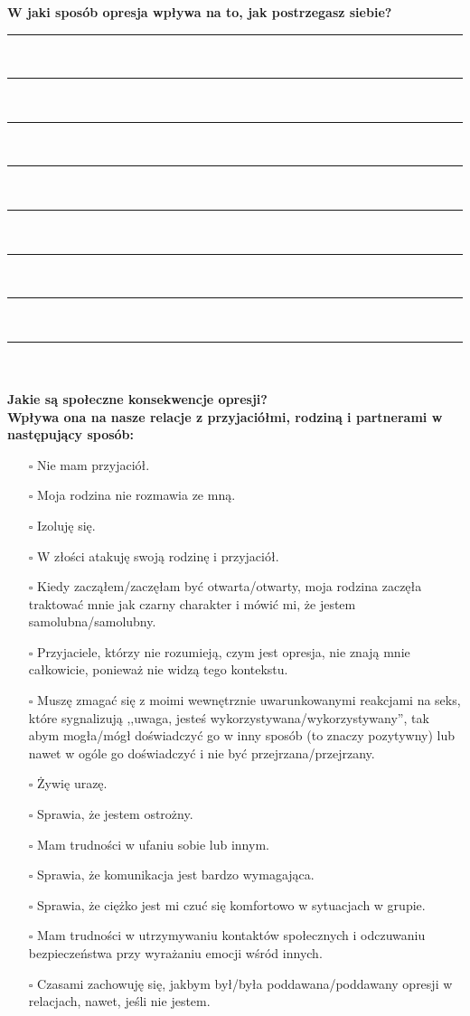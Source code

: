 \newpage
\noindent
\textcolor{ProcessBlue}{\textbf{\Large{W jaki sposób opresja wpływa na to, jak postrzegasz siebie?}}}\\
\noindent\rule{\textwidth}{1pt}\\
\noindent\rule{\textwidth}{1pt}\\
\noindent\rule{\textwidth}{1pt}\\
\noindent\rule{\textwidth}{1pt}\\
\noindent\rule{\textwidth}{1pt}\\
\noindent\rule{\textwidth}{1pt}\\
\noindent\rule{\textwidth}{1pt}\\
\noindent\rule{\textwidth}{1pt}\\\\

\noindent\textcolor{ProcessBlue}{\textbf{\Large{Jakie są społeczne konsekwencje opresji?}}}\\
\textbf{\large{Wpływa ona na nasze relacje z przyjaciółmi, rodziną i partnerami w następujący sposób:}}
\begin{multicols}{2}
\begin{itemize}
\item[$\square$]{Nie mam przyjaciół.}
\item[$\square$]{Moja rodzina nie rozmawia ze mną.}
\item[$\square$]{Izoluję się.}
\item[$\square$]{W złości atakuję swoją rodzinę i przyjaciół.}
\item[$\square$]{Kiedy zacząłem/zaczęłam być otwarta/otwarty, moja rodzina zaczęła traktować mnie jak czarny charakter i mówić mi, że jestem samolubna/samolubny.}
\item[$\square$]{Przyjaciele, którzy nie rozumieją, czym jest opresja, nie znają mnie całkowicie, ponieważ nie widzą tego kontekstu.}
\item[$\square$]{Muszę zmagać się z moimi wewnętrznie uwarunkowanymi reakcjami na seks, które sygnalizują ,,uwaga, jesteś wykorzystywana/wykorzystywany'', tak abym mogła/mógł doświadczyć go w inny sposób (to znaczy pozytywny) lub nawet w ogóle go doświadczyć i nie być przejrzana/przejrzany.}
\item[$\square$]{Żywię urazę.}
\item[$\square$]{Sprawia, że jestem ostrożny.}
\item[$\square$]{Mam trudności w ufaniu sobie lub innym.}
\item[$\square$]{Sprawia, że komunikacja jest bardzo wymagająca.}
\item[$\square$]{Sprawia, że ciężko jest mi czuć się komfortowo w sytuacjach w grupie.}
\item[$\square$]{Mam trudności w utrzymywaniu kontaktów społecznych i odczuwaniu bezpieczeństwa przy wyrażaniu emocji wśród innych.}
\item[$\square$]{Czasami zachowuję się, jakbym był/była poddawana/poddawany opresji w relacjach, nawet, jeśli nie jestem.}
\end{itemize}
\end{multicols}


